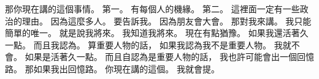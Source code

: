 \hypertarget{c01:cue:3023}{}那你現在講的這個事情。
\hypertarget{c01:cue:3024}{}第一。
\hypertarget{c01:cue:3025}{}有每個人的機緣。
\hypertarget{c01:cue:3026}{}第二。
\hypertarget{c01:cue:3027}{}這裡面一定有一些政治的理由。
\hypertarget{c01:cue:3028}{}因為這麼多人。
\hypertarget{c01:cue:3029}{}要告訴我。
\hypertarget{c01:cue:3030}{}因為朋友會大會。
\hypertarget{c01:cue:3031}{}那對我來講。
\hypertarget{c01:cue:3032}{}我只能簡單的唯一。
\hypertarget{c01:cue:3033}{}就是說我將來。
\hypertarget{c01:cue:3034}{}我知道我將來。
\hypertarget{c01:cue:3035}{}現在有點猶豫。
\hypertarget{c01:cue:3036}{}如果我還活著久一點。
\hypertarget{c01:cue:3037}{}而且我認為。
\hypertarget{c01:cue:3038}{}算重要人物的話，
\hypertarget{c01:cue:3039}{}如果我認為我不是重要人物。
\hypertarget{c01:cue:3040}{}我就不會。
\hypertarget{c01:cue:3041}{}如果是活著久一點。
\hypertarget{c01:cue:3042}{}而且自認為是重要人物的話，
\hypertarget{c01:cue:3043}{}我也許可能會出一個回憶路。
\hypertarget{c01:cue:3044}{}那如果我出回憶路。
\hypertarget{c01:cue:3045}{}你現在講的這個。
\hypertarget{c01:cue:3046}{}我就會提。

